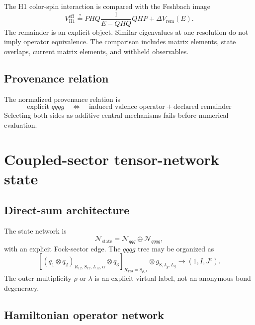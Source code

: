 \documentclass[11pt]{article}
\newcommand{\cN}{\mathcal N}
\newcommand{\eff}{\mathrm{eff}}
\newcommand{\Jz}{J^z}
\begin{document}
The H1 color-spin interaction is compared with the Feshbach image
\begin{equation}
 V_{\mathrm{H1}}^{\eff}
 \stackrel{?}{=}
 PHQ\frac{1}{E-QHQ}QHP
 +\Delta V_{\mathrm{rem}}(E).
 \label{eq:h1-h2-match}
\end{equation}
The remainder is an explicit object.  Similar eigenvalues at one resolution do
not imply operator equivalence.  The comparison includes matrix elements,
state overlaps, current matrix elements, and withheld observables.

\subsection{Provenance relation}

The normalized provenance relation is
\begin{equation}
 \boxed{
 \text{explicit }qqqg
 \quad\Longleftrightarrow\quad
 \text{induced valence operator}
 +\text{declared remainder}
 }
 \label{eq:prov-explicit-induced}
\end{equation}
Selecting both sides as additive central mechanisms fails before numerical
evaluation.

\section{Coupled-sector tensor-network state}

\subsection{Direct-sum architecture}

The state network is
\begin{equation}
 \cN_{\mathrm{state}}
 =
 \cN_{qqq}\oplus\cN_{qqqg},
 \label{eq:sector-tn}
\end{equation}
with an explicit Fock-sector edge.  The \(qqqg\) tree may be organized as
\begin{equation}
 \left[
 (q_1\otimes q_2)_{R_{12},S_{12},L_{12},\alpha}
 \otimes q_3
 \right]_{R_{123}=8_{\rho,\lambda}}
 \otimes g_{8,\lambda_g,L_g}
 \longrightarrow
 (1,I,\Jz).
 \label{eq:qqqg-tree}
\end{equation}
The outer multiplicity \(\rho\) or \(\lambda\) is an explicit virtual label,
not an anonymous bond degeneracy.

\subsection{Hamiltonian operator network}
\end{document}
